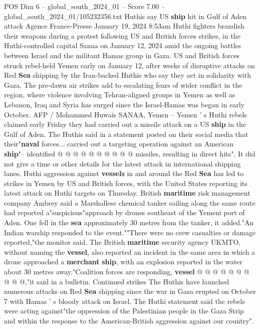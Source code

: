 \begin{textsample}{POS Dim 6 – global\_south\_2024\_01 – Score 7.00 – global\_south\_2024\_01/105232356.txt}  \label{ex:f6_pos_097}
Huthis say US \textbf{ship} hit in Gulf of Aden attack Agence France-Presse January 19, 2024 8:53am Huthi fighters brandish their weapons during a protest following US and British forces strikes, in the Huthi-controlled capital Sanaa on January 12, 2024 amid the ongoing battles between Israel and the militant Hamas group in Gaza.
US and British forces struck rebel-held Yemen early on January 12, after weeks of disruptive attacks on Red \textbf{Sea} shipping by the Iran-backed Huthis who say they act in solidarity with Gaza.
The pre-dawn air strikes add to escalating fears of wider conflict in the region, where violence involving Tehran-aligned groups in Yemen as well as Lebanon, Iraq and Syria has surged since the Israel-Hamas was began in early October.
AFP / Mohammed Huwais SANAA, Yemen -- Yemen ' s Huthi rebels claimed early Friday they had carried out a missile attack on a US \textbf{ship} in the Gulf of Aden.
The Huthis said in a statement posted on their social media that their"\textbf{naval} forces... carried out a targeting operation against an American \textbf{ship}"-- identified @ @ @ @ @ @ @ @ @ @ missiles, resulting in direct hits".
It did not give a time or other details for the latest attack in international shipping lanes.
Huthi aggression against \textbf{vessels} in and around the Red \textbf{Sea} has led to strikes in Yemen by US and British forces, with the United States reporting its latest attack on Huthi targets on Thursday.
British \textbf{maritime} risk management company Ambrey said a Marshallese chemical tanker sailing along the same route had reported a"suspicious"approach by drones southeast of the Yemeni port of Aden.
One fell in the \textbf{sea} approximately 30 metres from the tanker, it added."An Indian warship responded to the event.""There were no crew casualties or damage reported,"the monitor said.
The British \textbf{maritime} security agency UKMTO, without naming the \textbf{vessel}, also reported an incident in the same area in which a drone approached a \textbf{merchant} \textbf{ship}, with an explosion reported in the water about 30 metres away."Coalition forces are responding, \textbf{vessel} @ @ @ @ @ @ @ @ @ @,"it said in a bulletin.
Continued strikes The Huthis have launched numerous attacks on Red \textbf{Sea} shipping since the war in Gaza erupted on October 7 with Hamas ' s bloody attack on Israel.
The Huthi statement said the rebels were acting against"the oppression of the Palestinian people in the Gaza Strip and within the response to the American-British aggression against our country".

\end{textsample}
